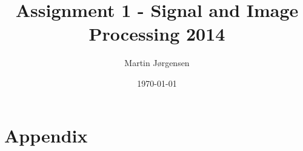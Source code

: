 \documentclass[a4paper,12pt]{article}
\title{Assignment 1 - Signal and Image Processing 2014}
\author{Martin Jørgensen}
\date{\today}
\begin{document}
\maketitle

\tableofcontents
\pagebreak












\appendix
\section{Appendix}

\end{document}
